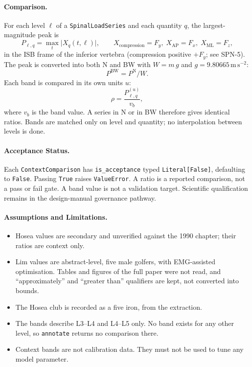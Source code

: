 \paragraph{Comparison.}
For each level $\ell$ of a \texttt{SpinalLoadSeries} and each quantity $q$, the
largest-magnitude peak is
\[
  P_{\ell,q} = \max_t \lvert X_{q}(t,\ell)\rvert,
  \qquad X_{\text{compression}} = F_y,\;
  X_{\text{AP}} = F_x,\;
  X_{\text{ML}} = F_z,
\]
in the ISB frame of the inferior vertebra (compression positive $+F_y$; see
SPN-5). The peak is converted into both N and BW with $W = m\,g$ and
$g = 9.80665\,\mathrm{m\,s^{-2}}$:
\[
  P^{\mathrm{BW}} = P^{\mathrm{N}}/W.
\]
Each band is compared in its own units $u$:
\[
  \rho = \frac{P_{\ell,q}^{(u)}}{v_b},
\]
where $v_b$ is the band value. A series in N or in BW therefore gives identical ratios.
Bands are matched only on level and quantity; no interpolation between levels is done.

\paragraph{Acceptance Status.}
Each \texttt{ContextComparison} has \texttt{is\_acceptance} typed
\texttt{Literal[False]}, defaulting to \texttt{False}. Passing \texttt{True} raises
\texttt{ValueError}. A ratio is a reported comparison, not a pass or fail gate.
A band value is not a validation target. Scientific qualification remains in the
design-manual governance pathway.

\paragraph{Assumptions and Limitations.}
\begin{itemize}
  \item Hosea values are secondary and unverified against the 1990 chapter; their
        ratios are context only.
  \item Lim values are abstract-level, five male golfers, with EMG-assisted
        optimisation. Tables and figures of the full paper were not read, and
        ``approximately'' and ``greater than'' qualifiers are kept, not
        converted into bounds.
  \item The Hosea club is recorded as a five iron, from the extraction.
  \item The bands describe L3--L4 and L4--L5 only. No band exists for any other
        level, so \texttt{annotate} returns no comparison there.
  \item Context bands are not calibration data. They must not be used to tune
        any model parameter.
\end{itemize}

